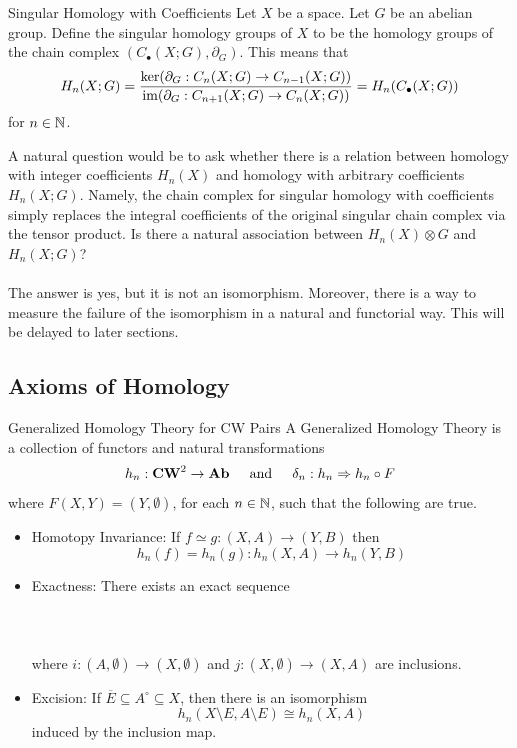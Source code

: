 \documentclass[a4paper]{article}
\begin{document}
\begin{defn}{Singular Homology with Coefficients}{} Let $X$ be a space. Let $G$ be an abelian group. Define the singular homology groups of $X$ to be the homology groups of the chain complex $(C_\bullet(X;G),\partial_G)$. This means that $$H_n(X;G)=\frac{\ker(\partial_G:C_n(X;G)\to C_{n-1}(X;G))}{\operatorname{im}(\partial_G:C_{n+1}(X;G)\to C_n(X;G))}=H_n(C_\bullet(X;G))$$ for $n\in\mathbb{N}$. 
\end{defn}

A natural question would be to ask whether there is a relation between homology with integer coefficients $H_n(X)$ and homology with arbitrary coefficients $H_n(X;G)$. Namely, the chain complex for singular homology with coefficients simply replaces the integral coefficients of the original singular chain complex via the tensor product. Is there a natural association between $H_n(X)\otimes G$ and $H_n(X;G)$? \\~\\

The answer is yes, but it is not an isomorphism. Moreover, there is a way to measure the failure of the isomorphism in a natural and functorial way. This will be delayed to later sections. 

\subsection{Axioms of Homology}
\begin{defn}{Generalized Homology Theory for CW Pairs}{} A Generalized Homology Theory is a collection of functors and natural transformations $$h_n:\bold{CW}^2\to\bold{Ab}\;\;\;\;\text{ and }\;\;\;\;\delta_n:h_n\Rightarrow h_n\circ F$$ where $F(X,Y)=(Y,\emptyset)$, for each $n\in\mathbb{N}$, such that the following are true. 
\begin{itemize}
\item Homotopy Invariance: If $f\simeq g:(X,A)\to(Y,B)$ then $$h_n(f)=h_n(g):h_n(X,A)\to h_n(Y,B)$$
\item Exactness: There exists an exact sequence \\~\\
\\~\\
where $i:(A,\emptyset)\to(X,\emptyset)$ and $j:(X,\emptyset)\to(X,A)$ are inclusions. 
\item Excision: If $\overline{E}\subseteq A^\circ\subseteq X$, then there is an isomorphism $$h_n(X\setminus E,A\setminus E)\cong h_n(X,A)$$ induced by the inclusion map. 
\end{itemize}
\end{defn}
\end{document}
